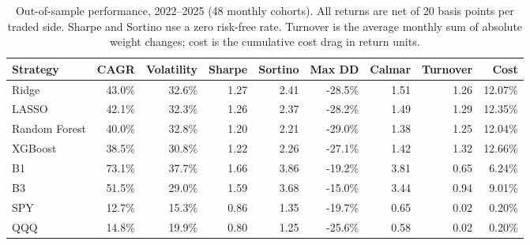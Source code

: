 \begin{table}[H]
\centering
\scriptsize
\begin{tabular}{lrrrrrrrr}
\toprule
Strategy & CAGR & Volatility & Sharpe & Sortino & Max DD & Calmar & Turnover & Cost \\
\midrule
Ridge & 43.0\% & 32.6\% & 1.27 & 2.41 & -28.5\% & 1.51 & 1.26 & 12.07\% \\
LASSO & 42.1\% & 32.3\% & 1.26 & 2.37 & -28.2\% & 1.49 & 1.29 & 12.35\% \\
Random Forest & 40.0\% & 32.8\% & 1.20 & 2.21 & -29.0\% & 1.38 & 1.25 & 12.04\% \\
XGBoost & 38.5\% & 30.8\% & 1.22 & 2.26 & -27.1\% & 1.42 & 1.32 & 12.66\% \\
B1 & 73.1\% & 37.7\% & 1.66 & 3.86 & -19.2\% & 3.81 & 0.65 & 6.24\% \\
B3 & 51.5\% & 29.0\% & 1.59 & 3.68 & -15.0\% & 3.44 & 0.94 & 9.01\% \\
SPY & 12.7\% & 15.3\% & 0.86 & 1.35 & -19.7\% & 0.65 & 0.02 & 0.20\% \\
QQQ & 14.8\% & 19.9\% & 0.80 & 1.25 & -25.6\% & 0.58 & 0.02 & 0.20\% \\
\bottomrule
\end{tabular}
\caption{Out-of-sample performance, 2022--2025 (48 monthly cohorts). All returns are net of 20 basis points per traded side. Sharpe and Sortino use a zero risk-free rate. Turnover is the average monthly sum of absolute weight changes; cost is the cumulative cost drag in return units.}
\label{tab:oos}
\end{table}
